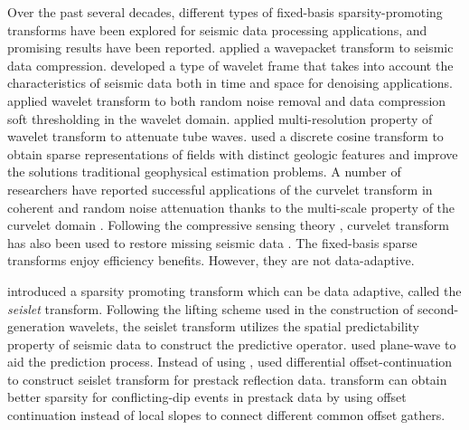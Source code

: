 Over the past several decades, different types of fixed-basis sparsity-promoting transforms have been explored for seismic data processing applications, and promising results have been reported. \cite{luoyi1992} applied a wavepacket transform to seismic data compression. \cite{zhangr2003} developed a type of wavelet frame that takes into account the characteristics of seismic data both in time and space for denoising applications. \cite{ioup1998} applied  wavelet transform to both random noise removal and data compression  soft thresholding in the wavelet domain. \cite{du2000} applied  multi-resolution property of wavelet transform to attenuate tube waves. \cite{jafarpour2009} used a discrete cosine transform  to obtain sparse representations of fields with distinct geologic features and  improve the solutions  traditional geophysical estimation problems. %
A number of researchers have reported successful applications of the curvelet transform in coherent and random noise attenuation thanks to the multi-scale  property of the curvelet domain \cite[]{hennenfent2006,deli2008,neelamani2008,neelamani2010}. %
Following the compressive sensing theory \cite[]{donoho2006}, curvelet transform has also been  used to restore missing seismic data \cite[]{hennenfent2010,mostafa2010}.  The fixed-basis sparse transforms enjoy efficiency benefits. However, they are not data-adaptive.

\cite{fomel2010seislet} introduced a  sparsity promoting transform which can be data adaptive, called the \emph{seislet} transform. Following the lifting scheme used in the construction of second-generation wavelets, the seislet transform utilizes the spatial predictability property of seismic data to construct the predictive operator. \cite{fomel2010seislet} used plane-wave   \cite[]{fomel2002pwd} to aid the prediction process. Instead of using , \cite{liuyang2010} used differential offset-continuation  to construct seislet transform for prestack reflection data.  transform can obtain better sparsity for conflicting-dip events in prestack data by using offset continuation instead of local slopes to connect different common offset gathers. %


